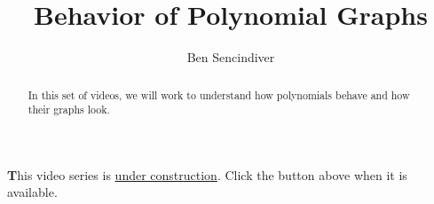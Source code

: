 \documentclass{ximera}
\title[Prerequisite Videos: ]{Behavior of Polynomial Graphs}
\author{Ben Sencindiver}
\begin{document}
\begin{abstract}
   In this set of videos, we will work to understand how 
   polynomials behave and how their graphs look.  
\end{abstract}
\maketitle



{\textbf This video series is \underline{under construction}. Click the  button above when it is available}.
\end{document}
